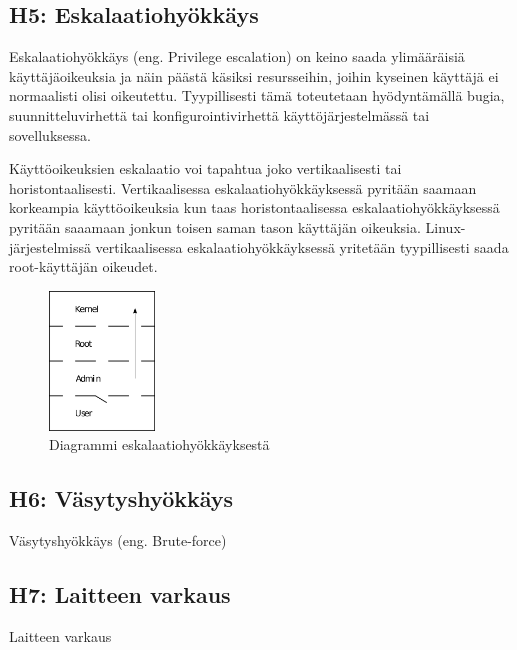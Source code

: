 \subsection{H5: Eskalaatiohyökkäys}
Eskalaatiohyökkäys (eng. Privilege escalation) on keino saada ylimääräisiä käyttäjäoikeuksia ja näin päästä käsiksi resursseihin, joihin kyseinen käyttäjä ei normaalisti olisi oikeutettu. Tyypillisesti tämä toteutetaan hyödyntämällä bugia, suunnitteluvirhettä tai konfigurointivirhettä käyttöjärjestelmässä tai sovelluksessa.

Käyttöoikeuksien eskalaatio voi tapahtua joko vertikaalisesti tai horistontaalisesti. Vertikaalisessa eskalaatiohyökkäyksessä pyritään saamaan korkeampia käyttöoikeuksia kun taas horistontaalisessa eskalaatiohyökkäyksessä pyritään saaamaan jonkun toisen saman tason käyttäjän oikeuksia. Linux-järjestelmissä vertikaalisessa eskalaatiohyökkäyksessä yritetään tyypillisesti saada root-käyttäjän oikeudet.~\cite{ciampa2012security+}

\begin{figure}
\centering \includegraphics[width=0.25\textwidth]{kuvat/privilege_escalation.png}
\caption{Diagrammi eskalaatiohyökkäyksestä~\cite{wikipedia:privilege_escalation}}
\label{privilege_escalation_diagram} 
\end{figure}

\subsection{H6: Väsytyshyökkäys}
Väsytyshyökkäys (eng. Brute-force)

\subsection{H7: Laitteen varkaus}
Laitteen varkaus

